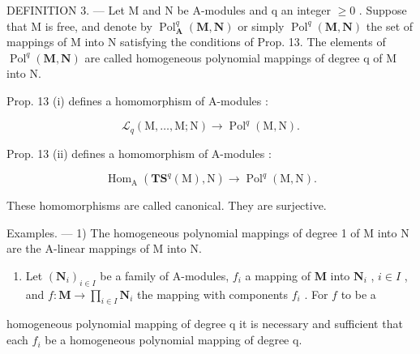 DEFINITION 3. --- Let M and N be A-modules and q an integer \(\geqslant 0\) . Suppose that M is free, and denote by \(\operatorname{Pol}_{\mathbf{A}}^{q}(\mathbf{M}, \mathbf{N})\) or simply \(\operatorname{Pol}^{q}(\mathbf{M}, \mathbf{N})\) the set of mappings of M into N satisfying the conditions of Prop. 13. The elements of \(\operatorname{Pol}^{q}(\mathbf{M}, \mathbf{N})\) are called homogeneous polynomial mappings of degree q of M into N.

Prop. 13 (i) defines a homomorphism of A-modules :

\[
\mathcal {L} _ {q} (\mathrm{M}, \dots , \mathrm{M}; \mathrm{N}) \rightarrow \operatorname{Pol} ^ {q} (\mathrm{M}, \mathrm{N}).
\]

Prop. 13 (ii) defines a homomorphism of A-modules :

\[
\operatorname{Hom} _ {\mathrm{A}} \left(\mathbf {T S} ^ {q} (\mathrm{M}), \mathrm{N}\right)\rightarrow \operatorname{Pol} ^ {q} (\mathrm{M}, \mathrm{N}).
\]

These homomorphisms are called canonical. They are surjective.

Examples. --- 1) The homogeneous polynomial mappings of degree 1 of M into N are the A-linear mappings of M into N.

\begin{enumerate}
\def\labelenumi{\arabic{enumi})}
\setcounter{enumi}{1}
\tightlist
\item
  Let \((\mathbf{N}_i)_{i\in I}\) be a family of A-modules, \(f_{i}\) a mapping of \(\mathbf{M}\) into \(\mathbf{N}_i\) , \(i\in I\) , and \(f:\mathbf{M}\to \prod_{i\in I}\mathbf{N}_i\) the mapping with components \(f_{i}\) . For \(f\) to be a
\end{enumerate}

homogeneous polynomial mapping of degree q it is necessary and sufficient that each \(f_{i}\) be a homogeneous polynomial mapping of degree q.

